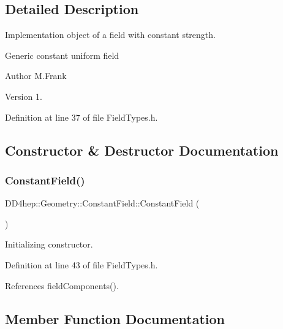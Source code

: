 \subsection{Detailed Description}
Implementation object of a field with constant strength. 

Generic constant uniform field

\begin{DoxyAuthor}{Author}
M.\+Frank 
\end{DoxyAuthor}
\begin{DoxyVersion}{Version}
1. 
\end{DoxyVersion}


Definition at line 37 of file Field\+Types.\+h.



\subsection{Constructor \& Destructor Documentation}
\hypertarget{class_d_d4hep_1_1_geometry_1_1_constant_field_a2fb76b37024098548c0a190666c8d30a}{}\label{class_d_d4hep_1_1_geometry_1_1_constant_field_a2fb76b37024098548c0a190666c8d30a} 
\subsubsection{\texorpdfstring{Constant\+Field()}{ConstantField()}}
{\footnotesize\ttfamily D\+D4hep\+::\+Geometry\+::\+Constant\+Field\+::\+Constant\+Field (\begin{DoxyParamCaption}{ }\end{DoxyParamCaption})\hspace{0.3cm}{\ttfamily [inline]}}



Initializing constructor. 



Definition at line 43 of file Field\+Types.\+h.



References field\+Components().



\subsection{Member Function Documentation}
\hypertarget{class_d_d4hep_1_1_geometry_1_1_constant_field_a512fc8911c0c3e710b363c455c2c9ea9}{}\label{class_d_d4hep_1_1_geometry_1_1_constant_field_a512fc8911c0c3e710b363c455c2c9ea9} 
